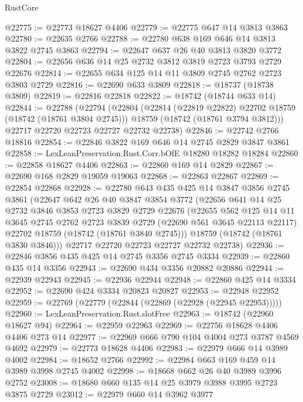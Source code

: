 \begin{lexlean}{RustCore}
\begin{coremodule}
@22775 := @22773 @18627 @4406
@22779 := @22775 @647 @14 @3813 @3863
@22780 := @22635 @2766
@22788 := @22780 @638 @169 @646 @14 @3813 @3822 @2745 @3863
@22794 := @22647 @637 @26 @40 @3813 @3820 @3772
@22804 := @22656 @636 @14 @25 @2732 @3812 @3819 @2723 @3793 @2729 @22676
@22814 := @22655 @634 @125 @14 @11 @3809 @2745 @2762 @2723 @3803 @2729
@22816 := @22690 @633 @3809
@22818 := @18737 (@18738 @3809)
@22819 := @22816 @22818
@22822 := @18742 (@18744 @633 @14)
@22844 := @22788
    (@22794
      (@22804
        (@22814 (@22819 @22822) @22702 @18759 (@18742 (@18761 @3804 @2745)))
        @18759
        (@18742 (@18761 @3794 @3812)))
      @22717
      @22720
      @22723
      @22727
      @22732
      @22738)
@22846 := @22742 @2766 @18816
@22854 := @22846 @3822 @169 @646 @14 @2745 @2829 @3847 @3861
@22858 := LexLeanPreservation.Rust.Corr.bOfE @18280 @18282 @18284
@22860 := @22858 @18627 @4406
@22863 := @22860 @169 @14 @2829
@22867 := @22690 @168 @2829 @19059 @19063
@22868 := @22863 @22867
@22869 := @22854 @22868
@22928 := @22780
    @643
    @435
    @425
    @14
    @3847
    @3856
    @2745
    @3861
    (@22647
      @642
      @26
      @40
      @3847
      @3854
      @3772
      (@22656
        @641
        @14
        @25
        @2732
        @3846
        @3853
        @2723
        @3829
        @2729
        @22676
        (@22655
          @562
          @125
          @14
          @11
          @3645
          @2745
          @2762
          @2723
          @3839
          @2729
          (@22690 @561 @3645 @22113 @22117)
          @22702
          @18759
          (@18742 (@18761 @3840 @2745)))
        @18759
        (@18742 (@18761 @3830 @3846)))
      @22717
      @22720
      @22723
      @22727
      @22732
      @22738)
@22936 := @22846 @3856 @435 @425 @14 @2745 @3356 @2745 @3334
@22939 := @22860 @435 @14 @3356
@22943 := @22690 @434 @3356 @20882 @20886
@22944 := @22939 @22943
@22945 := @22936 @22944
@22948 := @22860 @425 @14 @3334
@22952 := @22690 @424 @3334 @20823 @20827
@22953 := @22948 @22952
@22959 := @22769 (@22779 (@22844 (@22869 (@22928 (@22945 @22953)))))
@22960 := LexLeanPreservation.Rust.slotFree
@22963 := @18742 (@22960 @18627 @94)
@22964 := @22959 @22963
@22969 := @22756 @18628 @4406 @4406 @273 @14
@22977 := @22969 @666 @790 @104 @4004 @273 @3787 @4569 @4692
@22979 := @22773 @18628 @4406
@22983 := @22979 @666 @14 @3989 @4002
@22984 := @18652 @2766
@22992 := @22984 @663 @169 @459 @14 @3989 @3998 @2745 @4002
@22998 := @18668 @662 @26 @40 @3989 @3996 @2752
@23008 := @18680 @660 @135 @14 @25 @3979 @3988 @3995 @2723 @3875 @2729
@23012 := @22979 @660 @14 @3962 @3977

\end{coremodule}
\end{lexlean}
